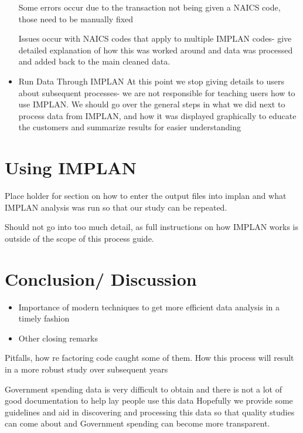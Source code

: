 \documentclass[
]{book}
\providecommand{\tightlist}{%
  \setlength{\itemsep}{0pt}\setlength{\parskip}{0pt}}
\begin{document}
\begin{itemize}
  Some errors occur due to the transaction not being given a NAICS code, those need to be manually fixed

  Issues occur with NAICS codes that apply to multiple IMPLAN codes- give detailed explanation of how this was worked around and data was processed and added back to the main cleaned data.
\item
  Run Data Through IMPLAN
  At this point we stop giving details to users about subsequent processes- we are not responsible for teaching users how to use IMPLAN.
  We should go over the general steps in what we did next to process data from IMPLAN, and how it was displayed graphically to educate the customers and
  summarize results for easier understanding
\end{itemize}

\hypertarget{using-implan}{%
\chapter{Using IMPLAN}\label{using-implan}}

Place holder for section on how to enter the output files into implan and what IMPLAN analysis was run so that our study can be repeated.

Should not go into too much detail, as full instructions on how IMPLAN works is outside of the scope of this process guide.

\hypertarget{conclusion-discussion}{%
\chapter{Conclusion/ Discussion}\label{conclusion-discussion}}

\begin{itemize}
\tightlist
\item
  Importance of modern techniques to get more efficient data analysis in a timely fashion
\item
  Other closing remarks
\end{itemize}

Pitfalls, how re factoring code caught some of them. How this process will result in a more robust study over subsequent years

Government spending data is very difficult to obtain and there is not a lot of good documentation to help lay people use this data
Hopefully we provide some guidelines and aid in discovering and processing this data so that quality studies can come about and
Government spending can become more transparent.
\end{document}
